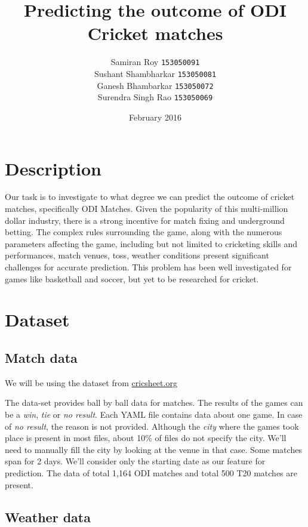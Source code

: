\documentclass{article}
\title{Predicting the outcome of ODI Cricket matches}
\author{Samiran Roy \texttt{153050091}\\Sushant Shambharkar \texttt{153050081}\\Ganesh Bhambarkar \texttt{153050072}\\Surendra Singh Rao \texttt{153050069}}
\date{February 2016}
\begin{document}
\maketitle

\begin{abstract}
 
\end{abstract}

\section{Description}

Our task is to investigate to what degree we can predict the outcome of cricket matches, specifically ODI Matches. Given the popularity of this multi-million dollar industry, there is a strong incentive for match fixing and underground betting.  The complex rules surrounding the game, along with the numerous parameters affecting the game, including but not limited to cricketing skills and performances, match venues, toss, weather conditions present significant challenges for accurate prediction. This problem has been well investigated for games like basketball and soccer, but yet to be researched for cricket.

\section{Dataset}

\subsection{Match data}

We will be using the dataset from \url{cricsheet.org}

The data-set provides ball by ball data for matches. The results of the games can be a \emph{win}, \emph{tie} or \emph{no result}. Each YAML file contains data about one game. In case of \emph{no result}, the reason is not provided. Although the \emph{city} where the games took place is present in most files, about 10\% of files do not specify the city. We'll need to manually fill the city by looking at the venue in that case. Some matches span for 2 days. We'll consider only the starting date as our feature for prediction. The data of total 1,164 ODI matches and total 500 T20 matches are present.


\subsection{Weather data}
\end{document}

